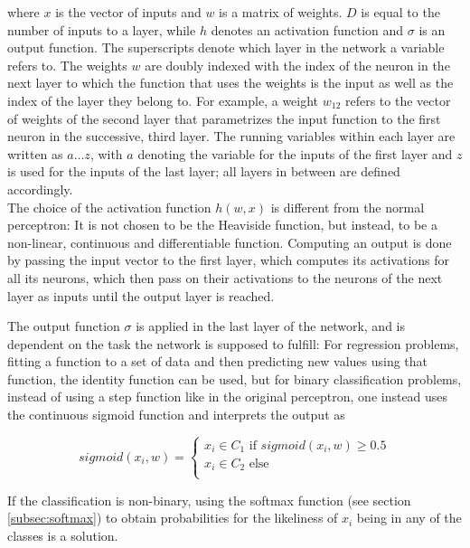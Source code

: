 \noindent where \textbf{$x$} is the vector of inputs and \textbf{$w$} is a matrix of weights. \textbf{$D$} is equal to the number of inputs to a layer, while \textbf{$h$} denotes an activation function and \textbf{$\sigma$} is an output function. The superscripts denote which layer in the network a variable refers to. The weights $w$ are doubly indexed with the index of the neuron in the next layer to which the function that uses the weights is the input as well as the index of the layer they belong to. For example, a weight $w_{12}$ refers to the vector of weights of the second layer that parametrizes the input function to the first neuron in the successive, third layer. The running variables within each layer are written as \textbf{$a \dots z$}, with \textbf{$a$} denoting the variable for the inputs of the first layer and \textbf{$z$} is used for the inputs of the last layer; all layers in between are defined accordingly.\\

\noindent The choice of the activation function $h(w, x)$ is different from the normal perceptron: It is not chosen to be the Heaviside function, but instead, to be a non-linear, continuous and differentiable function. Computing an output is done by passing the input vector to the first layer, which computes its activations for all its neurons, which then pass on their activations to the neurons of the next layer as inputs until the output layer is reached.

The output function $\sigma$ is applied in the last layer of the network, and is dependent on the task the network is supposed to fulfill: For regression problems, fitting a function to a set of data and then predicting new values using that function, the identity function can be used, but for binary classification problems, instead of using a step function like in the original perceptron, one instead uses the continuous sigmoid function and interprets the output as

\[ sigmoid(x_i, w) =  \begin{cases}
				x_i \in C_1 \text{ if } sigmoid(x_i, w) \geq 0.5 \\
				x_i \in C_2 \text{ else }\\
			 \end{cases}
\]

\noindent If the classification is non-binary, using the softmax function (see section \ref{subsec:softmax}) to obtain probabilities for the likeliness of $x_i$ being in any of the classes is a solution. 

